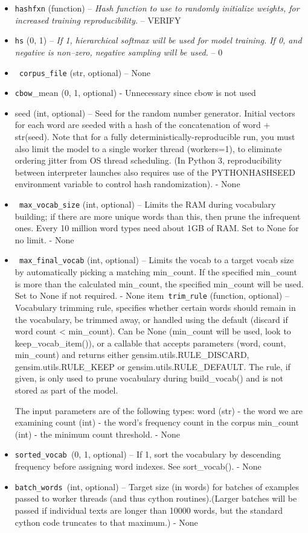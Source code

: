 \begin{itemize}
   \item \texttt{hashfxn} (function) -- \textit{Hash function to use to randomly initialize weights, for increased training reproducibility. }-- VERIFY 
  \item  \texttt{hs} ({0, 1}) --\textit{ If 1, hierarchical softmax will be used for model training. If 0, and negative is non--zero, negative sampling will be used. }-- 0
 \item  \texttt{ corpus\_file} (str, optional) – None
   \item \texttt{cbow}\_mean ({0, 1}, optional) - Unnecessary since cbow is not used
    \item seed (int, optional) – Seed for the random number generator. Initial vectors for each word are seeded with a hash of the concatenation of word + str(seed). Note that for a fully deterministically-reproducible run, you must also limit the model to a single worker thread (workers=1), to eliminate ordering jitter from OS thread scheduling. (In Python 3, reproducibility between interpreter launches also requires use of the PYTHONHASHSEED environment variable to control hash randomization). - None 
\item   \texttt{ max\_vocab\_size} (int, optional) – Limits the RAM during vocabulary building; if there are more unique words than this, then prune the infrequent ones. Every 10 million word types need about 1GB of RAM. Set to None for no limit. - None 
\item \texttt{   max\_final\_vocab} (int, optional) – Limits the vocab to a target vocab size by automatically picking a matching min\_count. If the specified min\_count is more than the calculated min\_count, the specified min\_count will be used. Set to None if not required. - None
item\texttt{   trim\_rule} (function, optional) –Vocabulary trimming rule, specifies whether certain words should remain in the vocabulary, be trimmed away, or handled using the default (discard if word count < min\_count). Can be None (min\_count will be used, look to keep\_vocab\_item()), or a callable that accepts parameters (word, count, min\_count) and returns either gensim.utils.RULE\_DISCARD, gensim.utils.RULE\_KEEP or gensim.utils.RULE\_DEFAULT. The rule, if given, is only used to prune vocabulary during build\_vocab() and is not stored as part of the model.

    The input parameters are of the following types:
            word (str) - the word we are examining
            count (int) - the word’s frequency count in the corpus
            min\_count (int) - the minimum count threshold. - None

  \item  \texttt{sorted\_vocab }({0, 1}, optional) – If 1, sort the vocabulary by descending frequency before assigning word indexes. See sort\_vocab(). - None
 \item   \texttt{batch\_words }(int, optional) – Target size (in words) for batches of examples passed to worker threads (and thus cython routines).(Larger batches will be passed if individual texts are longer than 10000 words, but the standard cython code truncates to that maximum.) - None 
\end{itemize}

